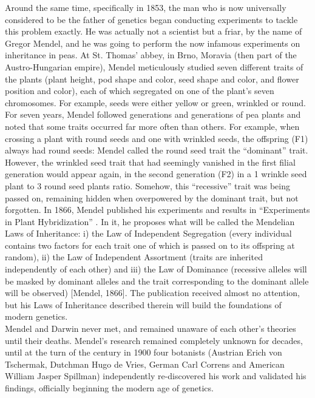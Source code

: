 Around the same time, specifically in 1853, the man who is now universally considered to be the father of genetics began conducting experiments to tackle this problem exactly. 
He was actually not a scientist but a friar, by the name of Gregor Mendel, and he was going to perform the now infamous experiments on inheritance in peas. 
At St. Thomas’ abbey, in Brno, Moravia (then part of the Austro-Hungarian empire), Mendel meticulously studied seven different traits of the plants (plant height, pod shape and color, seed shape and color, and flower position and color), each of which segregated on one of the plant's seven chromosomes. 
For example, seeds were either yellow or green, wrinkled or round. For seven years, Mendel followed generations and generations of pea plants and noted that some traits occurred far more often than others. 
For example, when crossing a plant with round seeds and one with wrinkled seeds, the offspring (F1) always had round seeds: Mendel called the round seed trait the “dominant” trait. However, the wrinkled seed trait that had seemingly vanished in the first filial generation would appear again, in the second generation (F2) in a 1 wrinkle seed plant to 3 round seed plants ratio. Somehow, this “recessive” trait was being passed on, remaining hidden when overpowered by the dominant trait, but not forgotten. 
In 1866, Mendel published his experiments and results in “Experiments in Plant Hybridization” \cite{mendel1996experiments}. 
In it, he proposes what will be called the Mendelian Laws of Inheritance: i) the Law of Independent Segregation (every individual contains two factors for each trait one of which is passed on to its offspring at random), ii) the Law of Independent Assortment (traits are inherited independently of each other) and iii) the Law of Dominance (recessive alleles will be masked by dominant alleles and the trait corresponding to the dominant allele will be observed) [Mendel, 1866]. 
The publication received almost no attention, but his Laws of Inheritance described therein will build the foundations of modern genetics.\\

Mendel and Darwin never met, and remained unaware of each other’s theories until their deaths. Mendel’s research remained completely unknown for decades, until at the turn of the century in 1900 four botanists (Austrian Erich von Tschermak, Dutchman Hugo de Vries, German Carl Correns and American William Jasper Spillman) independently re-discovered his work and validated his findings, officially beginning the modern age of genetics.\\ 

